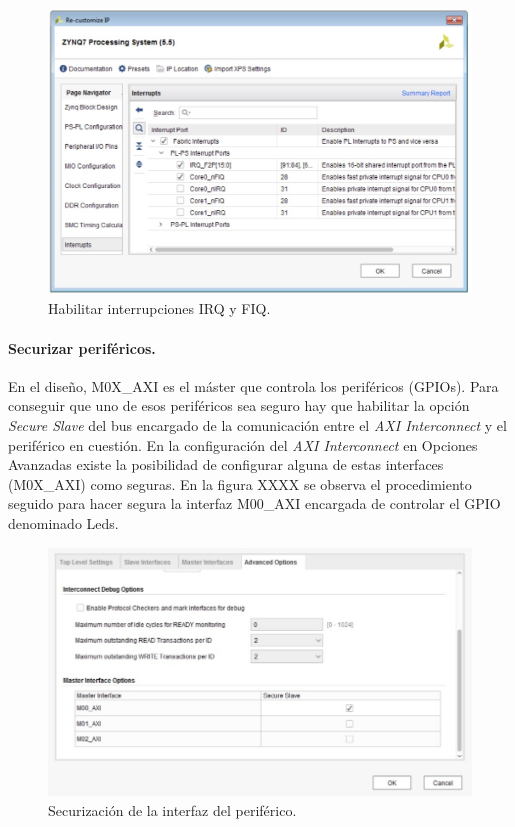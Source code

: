 \begin{figure}
	\centering
	\includegraphics[width=1\textwidth]{imagenes/interrupciones.jpg}
	\caption{\label{fig1}Habilitar interrupciones IRQ y FIQ.}
\end{figure}

\paragraph{Securizar periféricos.}
En el diseño, M0X\_AXI es el máster que controla los periféricos (GPIOs). Para conseguir que uno de esos periféricos sea seguro hay que habilitar la opción \textit{Secure Slave} del bus encargado de la comunicación entre el \textit{AXI Interconnect} y el periférico en cuestión. En la configuración del  \textit{AXI Interconnect} en Opciones Avanzadas existe la posibilidad de configurar alguna de estas interfaces (M0X\_AXI) como seguras. En la figura XXXX se observa el procedimiento seguido para hacer segura la interfaz M00\_AXI encargada de controlar el GPIO denominado Leds. \newline

\begin{figure}
	\centering
	\includegraphics[width=1\textwidth]{imagenes/secureslave.jpg}
	\caption{\label{fig1}Securización de la interfaz del periférico.}
\end{figure}


